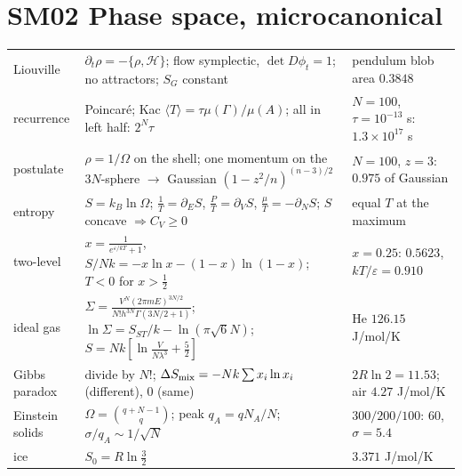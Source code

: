 \documentclass[9pt]{article}
\begin{document}
\section*{SM02 Phase space, microcanonical}
\begin{tabular}{@{}p{2.9cm}p{8.9cm}p{5.6cm}@{}}
\toprule
Liouville & $\partial_t\rho=-\{\rho,\mathcal H\}$; flow symplectic, $\det D\phi_t=1$; no attractors; $S_G$ constant & pendulum blob area $0.3848$\\
recurrence & Poincar\'e; Kac $\langle T\rangle=\tau\mu(\Gamma)/\mu(A)$; all in left half: $2^N\tau$ & $N=100$, $\tau=10^{-13}$ s: $1.3\times10^{17}$ s\\
postulate & $\rho=1/\Omega$ on the shell; one momentum on the $3N$-sphere $\to$ Gaussian $(1-z^2/n)^{(n-3)/2}$ & $N=100$, $z=3$: $0.975$ of Gaussian\\
entropy & $S=k_B\ln\Omega$; $\tfrac1T=\partial_ES$, $\tfrac PT=\partial_VS$, $\tfrac\mu T=-\partial_NS$; $S$ concave $\Rightarrow C_V\ge0$ & equal $T$ at the maximum\\
two-level & $x=\tfrac1{e^{\varepsilon/kT}+1}$, $S/Nk=-x\ln x-(1-x)\ln(1-x)$; $T<0$ for $x>\tfrac12$ & $x=0.25$: $0.5623$, $kT/\varepsilon=0.910$\\
ideal gas & $\Sigma=\tfrac{V^N(2\pi mE)^{3N/2}}{N!h^{3N}\Gamma(3N/2+1)}$; $\ln\Sigma=S_{ST}/k-\ln(\pi\sqrt6N)$; $S=Nk[\ln\tfrac V{N\lambda^3}+\tfrac52]$ & He $126.15$ J/mol/K\\
Gibbs paradox & divide by $N!$; $\Delta S_{\rm mix}=-Nk\sum x_i\ln x_i$ (different), $0$ (same) & $2R\ln2=11.53$; air $4.27$ J/mol/K\\
Einstein solids & $\Omega=\binom{q+N-1}q$; peak $q_A=qN_A/N$; $\sigma/q_A\sim1/\sqrt N$ & $300/200/100$: $60$, $\sigma=5.4$\\
ice & $S_0=R\ln\tfrac32$ & $3.371$ J/mol/K\\
\bottomrule
\end{tabular}
\end{document}
